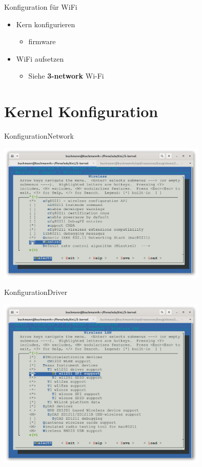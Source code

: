 \begin{frame}{Konfiguration für WiFi}
\begin{itemize}
 \item Kern konfigurieren
 \begin{itemize}
  \item firmware
 \end{itemize}
 \item WiFi aufsetzen
 \begin{itemize}
  \item Siehe {\bf 3-network} Wi-Fi 
 \end{itemize}
\end{itemize}
\end{frame}

\section{Kernel Konfiguration}

\begin{frame}{Konfiguration}{Network}
\begin{center}
\includegraphics[width=0.75\textwidth]{wireless.png}
\end{center}
\end{frame}

\begin{frame}{Konfiguration}{Driver}
\begin{center}
\includegraphics[width=0.75\textwidth]{wireless-ti.png}
\end{center}
\end{frame}

